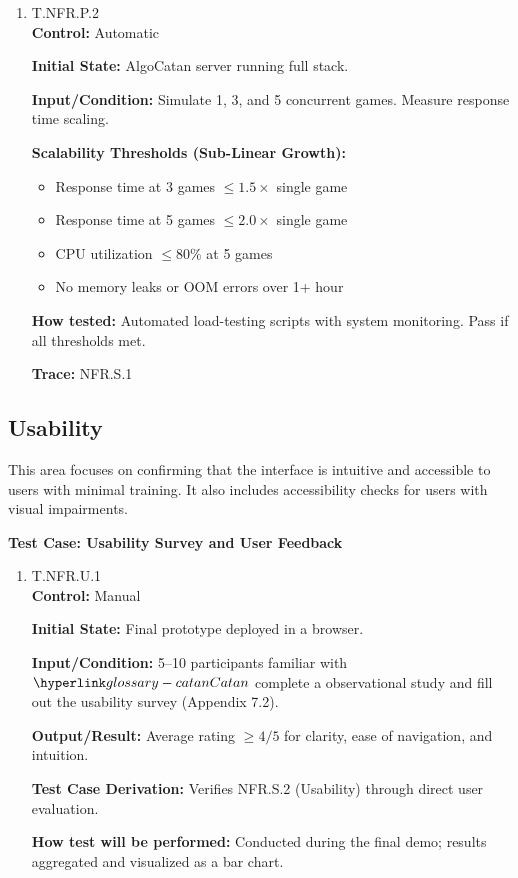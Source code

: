 \documentclass[12pt, titlepage]{article}
\begin{document}
\begin{enumerate}
\item{\hypertarget{T.NFR.P.2}{T.NFR.P.2}\\}
\textbf{Control:} Automatic

\textbf{Initial State:} AlgoCatan server running full stack.

\textbf{Input/Condition:} Simulate 1, 3, and 5 concurrent games.
Measure response time scaling.

\textbf{Scalability Thresholds (Sub-Linear Growth):}
\begin{itemize}
    \item Response time at 3 games $\leq 1.5 \times$ single game
    \item Response time at 5 games $\leq 2.0 \times$ single game
    \item CPU utilization $\leq 80\%$ at 5 games
    \item No memory leaks or OOM errors over 1+ hour
\end{itemize}

\textbf{How tested:} Automated load-testing scripts with system monitoring.
Pass if all thresholds met.

\textbf{Trace:} NFR.S.1
\end{enumerate}

\subsection{Usability}

This area focuses on confirming that the interface is intuitive and accessible to users with minimal training. It also includes accessibility checks for users with visual impairments.

\textbf{Test Case: Usability Survey and User Feedback}

\begin{enumerate}
\item{\hypertarget{T.NFR.U.1}{T.NFR.U.1}\\}
\textbf{Control:} Manual

\textbf{Initial State:} Final prototype deployed in a browser.

\textbf{Input/Condition:} 5--10 participants familiar with $\Catan{}$ complete a observational study and fill out the usability survey (Appendix 7.2).

\textbf{Output/Result:} Average rating $\geq 4/5$ for clarity, ease of navigation, and intuition.

\textbf{Test Case Derivation:} Verifies NFR.S.2 (Usability) through direct user evaluation.

\textbf{How test will be performed:} Conducted during the final demo; results aggregated and visualized as a bar chart.
\end{enumerate}
\end{document}
